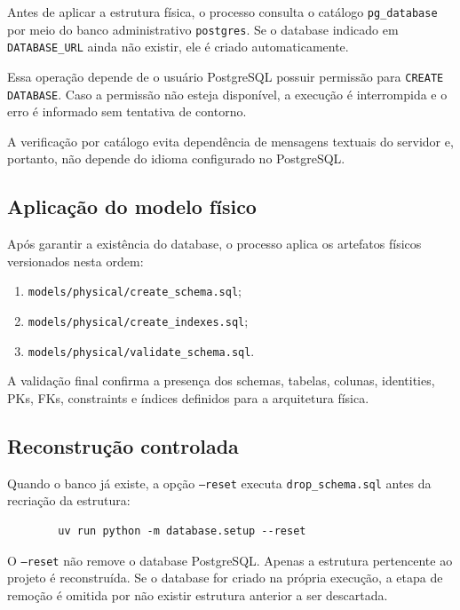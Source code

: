 \documentclass[12pt,a4paper]{article}
\begin{document}
	Antes de aplicar a estrutura física, o processo consulta o catálogo
	\texttt{pg\_database} por meio do banco administrativo \texttt{postgres}. Se o
	database indicado em \texttt{DATABASE\_URL} ainda não existir, ele é criado
	automaticamente.
	
	Essa operação depende de o usuário PostgreSQL possuir permissão para
	\texttt{CREATE DATABASE}. Caso a permissão não esteja disponível, a execução é
	interrompida e o erro é informado sem tentativa de contorno.
	
	A verificação por catálogo evita dependência de mensagens textuais do servidor
	e, portanto, não depende do idioma configurado no PostgreSQL.
	
	\subsection{Aplicação do modelo físico}
	
	Após garantir a existência do database, o processo aplica os artefatos físicos
	versionados nesta ordem:
	
	\begin{enumerate}[leftmargin=1.2cm]
		\item \texttt{models/physical/create\_schema.sql};
		\item \texttt{models/physical/create\_indexes.sql};
		\item \texttt{models/physical/validate\_schema.sql}.
	\end{enumerate}
	
	A validação final confirma a presença dos schemas, tabelas, colunas, identities,
	PKs, FKs, constraints e índices definidos para a arquitetura física.
	
	\subsection{Reconstrução controlada}
	
	Quando o banco já existe, a opção \texttt{--reset} executa
	\texttt{drop\_schema.sql} antes da recriação da estrutura:
	
	\begin{verbatim}
		uv run python -m database.setup --reset
	\end{verbatim}
	
	O \texttt{--reset} não remove o database PostgreSQL. Apenas a estrutura
	pertencente ao projeto é reconstruída. Se o database for criado na própria
	execução, a etapa de remoção é omitida por não existir estrutura anterior a ser
	descartada.
	
\end{document}
